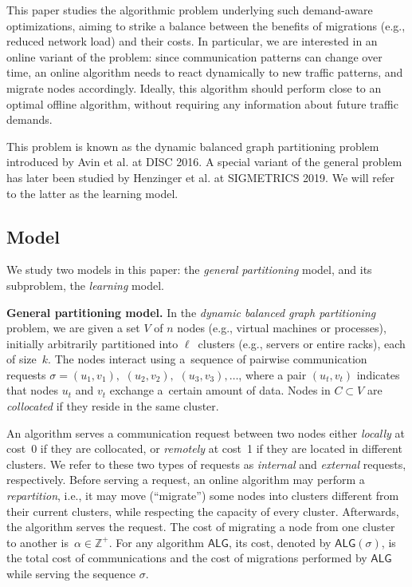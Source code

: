 \documentclass[a4paper,anonymous,USenglish]{lipics-v2019}
\newcommand{\ALG}{\textsf{ALG}\xspace}
\begin{document}
This paper studies the algorithmic problem underlying such demand-aware
optimizations, aiming to strike a balance between the benefits of migrations (e.g., reduced network load) and their costs.
In particular, we are interested in an online variant of the problem: since communication patterns can change over time, an online algorithm needs to react dynamically to new traffic patterns, and migrate nodes  accordingly.
Ideally, this algorithm should perform close to an optimal offline algorithm, without requiring any information about future traffic demands. 

This problem is known as the dynamic balanced graph partitioning problem introduced by Avin et al. \cite{repartition-disc, sidma-arxiv} at DISC 2016. A special variant of the general problem has later been studied by Henzinger et al. \cite{sigmetrics19_partitioning} at SIGMETRICS 2019.
We will refer to the latter as the learning model.



\subsection{Model}

We study two models in this paper: the \emph{general partitioning} model, and its subproblem, the \emph{learning} model.

\noindent
\textbf{General partitioning model.}
In the \emph{dynamic balanced graph partitioning} problem, we are given a set $V$ of $n$ nodes 
(e.g., virtual machines or processes),
initially arbitrarily partitioned into $\ell$~clusters
(e.g., servers or entire racks),
each of size~$k$.
The nodes interact using
a~sequence of pairwise communication requests
$\sigma = (u_1,v_1),$ $(u_2,v_2),$ $(u_3,v_3), \ldots$,
where a pair $(u_t,v_t)$ indicates that nodes $u_t$ and $v_t$ exchange a~certain amount of data.
Nodes in $C \subset V$ are \emph{collocated}
if they reside in the same cluster.

An algorithm serves a communication request between two nodes
either \emph{locally} at cost~0
if they are collocated,
or \emph{remotely} at cost~1
if they are located in different clusters.
We refer to these two types of requests as \emph{internal}
and \emph{external} requests, respectively.
Before serving a request,
an online algorithm may perform a \emph{repartition},
i.e.,
it may move (``migrate'') some nodes into clusters different from their current clusters, while respecting the capacity of every cluster. 
Afterwards, 
the algorithm serves the  request.
The cost of migrating a node from one cluster to another
is~$\alpha \in \mathbb{Z}^+$.
For any algorithm $\ALG$,
its cost,
denoted by $\ALG(\sigma)$,
is the total cost of communications and
the cost of migrations performed by $\ALG$ while serving the sequence $\sigma$.
\end{document}
